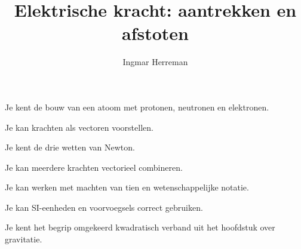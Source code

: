 \documentclass{ximera}
\title{Elektrische kracht: aantrekken en afstoten}
\author{Ingmar Herreman}
\begin{document}











\maketitle



\begin{voorkennis}
  \item Je kent de bouw van een atoom met protonen, neutronen en
        elektronen.
  \item Je kan krachten als vectoren voorstellen.
  \item Je kent de drie wetten van Newton.
  \item Je kan meerdere krachten vectorieel combineren.
  \item Je kan werken met machten van tien en wetenschappelijke notatie.
  \item Je kan SI-eenheden en voorvoegsels correct gebruiken.
  \item Je kent het begrip omgekeerd kwadratisch verband uit het
        hoofdstuk over gravitatie.
\end{voorkennis}


\end{document}
